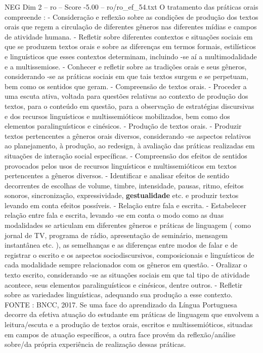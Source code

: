 \begin{textsample}{NEG Dim 2 – ro – Score -5.00 – ro/ro\_ef\_54.txt}
O tratamento das práticas orais compreende : - Consideração e reflexão sobre as condições de produção dos textos orais que regem a circulação de diferentes gêneros nas diferentes mídias e campos de atividade humana. - Refletir sobre diferentes contextos e situações sociais em que se produzem textos orais e sobre as diferenças em termos formais, estilísticos e linguísticos que esses contextos determinam, incluindo -se aí a multimodalidade e a multissemiose. - Conhecer e refletir sobre as tradições orais e seus gêneros, considerando -se as práticas sociais em que tais textos surgem e se perpetuam, bem como os sentidos que geram. - Compreensão de textos orais. - Proceder a uma escuta ativa, voltada para questões relativas ao contexto de produção dos textos, para o conteúdo em questão, para a observação de estratégias discursivas e dos recursos linguísticos e multissemióticos mobilizados, bem como dos elementos paralinguísticos e cinésicos. - Produção de textos orais. - Produzir textos pertencentes a gêneros orais diversos, considerando -se aspectos relativos ao planejamento, à produção, ao redesign, à avaliação das práticas realizadas em situações de interação social específicas. - Compreensão dos efeitos de sentidos provocados pelos usos de recursos linguísticos e multissemióticos em textos pertencentes a gêneros diversos. - Identificar e analisar efeitos de sentido decorrentes de escolhas de volume, timbre, intensidade, pausas, ritmo, efeitos sonoros, sincronização, expressividade, \textbf{gestualidade} etc. e produzir textos levando em conta efeitos possíveis. - Relação entre fala e escrita. - Estabelecer relação entre fala e escrita, levando -se em conta o modo como as duas modalidades se articulam em diferentes gêneros e práticas de linguagem ( como jornal de TV, programa de rádio, apresentação de seminário, mensagem instantânea etc. ), as semelhanças e as diferenças entre modos de falar e de registrar o escrito e os aspectos sociodiscursivos, composicionais e linguísticos de cada modalidade sempre relacionados com os gêneros em questão. - Oralizar o texto escrito, considerando -se as situações sociais em que tal tipo de atividade acontece, seus elementos paralinguísticos e cinésicos, dentre outros. - Refletir sobre as variedades linguísticas, adequando sua produção a esse contexto.
FONTE : BNCC, 2017.
Se uma face do aprendizado da Língua Portuguesa decorre da efetiva atuação do estudante em práticas de linguagem que envolvem a leitura/escuta e a produção de textos orais, escritos e multissemióticos, situadas em campos de atuação específicos, a outra face provém da reflexão/análise sobre/da própria experiência de realização dessas práticas.

\end{textsample}
